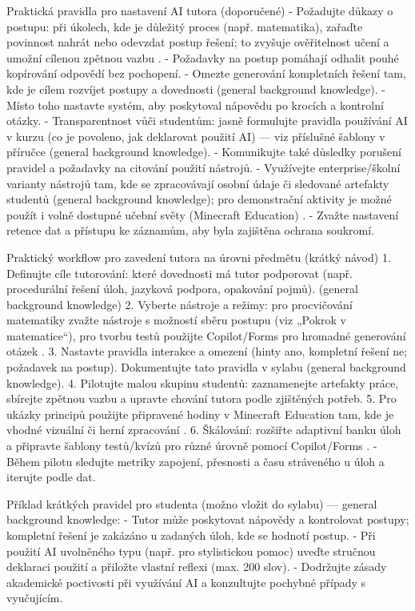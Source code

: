 Praktická pravidla pro nastavení AI tutora (doporučené)
- Požadujte důkazy o postupu: při úkolech, kde je důležitý proces (např. matematika), zařaďte povinnost nahrát nebo odevzdat postup řešení; to zvyšuje ověřitelnost učení a umožní cílenou zpětnou vazbu \cite{kb_ai_101_tipu_pdf_04e4a115_page_8_1}.
- Požadavky na postup pomáhají odhalit pouhé kopírování odpovědí bez pochopení.
- Omezte generování kompletních řešení tam, kde je cílem rozvíjet postupy a dovednosti (general background knowledge).
- Místo toho nastavte systém, aby poskytoval nápovědu po krocích a kontrolní otázky.
- Transparentnost vůči studentům: jasně formulujte pravidla používání AI v kurzu (co je povoleno, jak deklarovat použití AI) — viz příslušné šablony v příručce (general background knowledge).
- Komunikujte také důsledky porušení pravidel a požadavky na citování použití nástrojů.
- Využívejte enterprise/školní varianty nástrojů tam, kde se zpracovávají osobní údaje či sledované artefakty studentů (general background knowledge); pro demonstrační aktivity je možné použít i volně dostupné učební světy (Minecraft Education) \cite{kb_ai_101_tipu_pdf_04e4a115_page_15_2}.
- Zvažte nastavení retence dat a přístupu ke záznamům, aby byla zajištěna ochrana soukromí.

Praktický workflow pro zavedení tutora na úrovni předmětu (krátký návod)
1. Definujte cíle tutorování: které dovednosti má tutor podporovat (např. procedurální řešení úloh, jazyková podpora, opakování pojmů). (general background knowledge)
2. Vyberte nástroje a režimy: pro procvičování matematiky zvažte nástroje s možností sběru postupu (viz „Pokrok v matematice“), pro tvorbu testů použijte Copilot/Forms pro hromadné generování otázek \cite{kb_ai_101_tipu_pdf_04e4a115_page_8_1,kb_ai_101_tipu_pdf_04e4a115_page_36_1}.
3. Nastavte pravidla interakce a omezení (hinty ano, kompletní řešení ne; požadavek na postup). Dokumentujte tato pravidla v sylabu (general background knowledge).
4. Pilotujte malou skupinu studentů: zaznamenejte artefakty práce, sbírejte zpětnou vazbu a upravte chování tutora podle zjištěných potřeb.
5. Pro ukázky principů použijte připravené hodiny v Minecraft Education tam, kde je vhodné vizuální či herní zpracování \cite{kb_ai_101_tipu_pdf_04e4a115_page_15_2}.
6. Škálování: rozšiřte adaptivní banku úloh a připravte šablony testů/kvízů pro různé úrovně pomocí Copilot/Forms \cite{kb_ai_101_tipu_pdf_04e4a115_page_36_1}.
- Během pilotu sledujte metriky zapojení, přesnosti a času stráveného u úloh a iterujte podle dat.

Příklad krátkých pravidel pro studenta (možno vložit do sylabu) — general background knowledge:
- Tutor může poskytovat nápovědy a kontrolovat postupy; kompletní řešení je zakázáno u zadaných úloh, kde se hodnotí postup.
- Při použití AI uvolněného typu (např. pro stylistickou pomoc) uveďte stručnou deklaraci použití a přiložte vlastní reflexi (max. 200 slov).
- Dodržujte zásady akademické poctivosti při využívání AI a konzultujte pochybné případy s vyučujícím.

